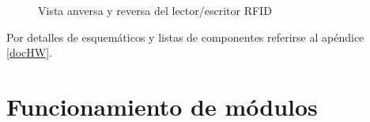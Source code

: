 \begin{figure}[H]
  \centering

  \caption{Vista anversa y reversa del lector/escritor RFID}\label{l/eRFID}
\end{figure}

\bigskip
Por detalles de esquemáticos y listas de componentes referirse al apéndice \ref{docHW}.

\newpage
\section{Funcionamiento de m\'odulos}

